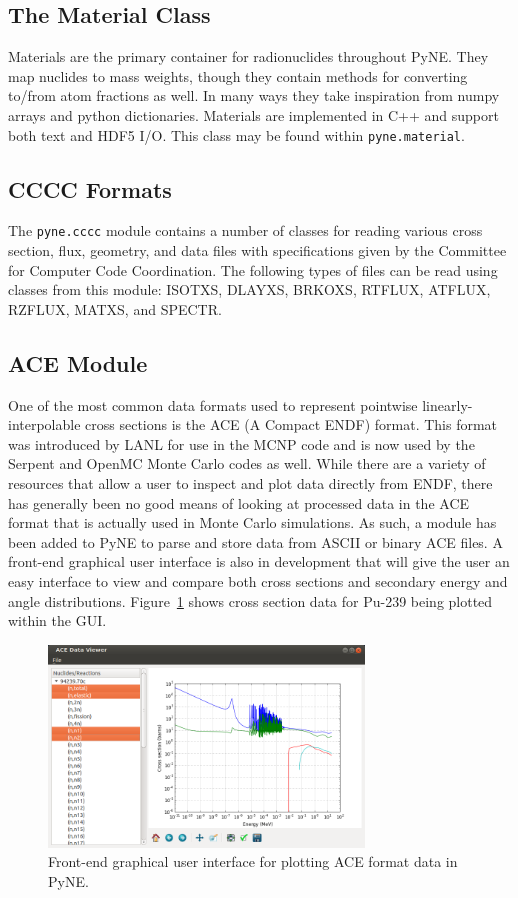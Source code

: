 \documentclass{anstrans}
\begin{document}
\subsection{The Material Class} 
Materials are the primary container for radionuclides throughout PyNE. They map 
nuclides to mass weights, though they contain methods for converting to/from 
atom fractions as well.  In many ways they take inspiration from numpy arrays 
and python dictionaries.  Materials are implemented in C++ and support both text
and HDF5 I/O.  This class may be found within \texttt{pyne.material}.


\subsection{CCCC Formats}
The \texttt{pyne.cccc} module contains a number of classes for reading various cross section, 
flux, geometry, and data files with specifications given by the Committee for 
Computer Code Coordination. The following types of files can be read using 
classes from this module: ISOTXS, DLAYXS, BRKOXS, RTFLUX, ATFLUX, RZFLUX, MATXS, 
and SPECTR.

\subsection{ACE Module}

One of the most common data formats used to represent pointwise
linearly-interpolable cross sections is the ACE (A Compact ENDF) format. This
format was introduced by LANL for use in the MCNP \cite{mcnp} code and is now
used by the Serpent \cite{serpent} and OpenMC \cite{openmc} Monte Carlo codes as
well. While there are a variety of resources that allow a user to inspect and
plot data directly from ENDF, there has generally been no good means of looking
at processed data in the ACE format that is actually used in Monte Carlo
simulations. As such, a module has been added to PyNE to parse and store data
from ASCII or binary ACE files. A front-end graphical user interface is also in
development that will give the user an easy interface to view and compare both
cross sections and secondary energy and angle
distributions. Figure~\ref{fig:ace-gui} shows cross section data for Pu-239
being plotted within the GUI.
\begin{figure}[ht]
  \centering
  \includegraphics[width=3.3in]{ace-gui.png}
  \caption{Front-end graphical user interface for plotting ACE format data in
    PyNE.}
  \label{fig:ace-gui}
\end{figure}
\end{document}
